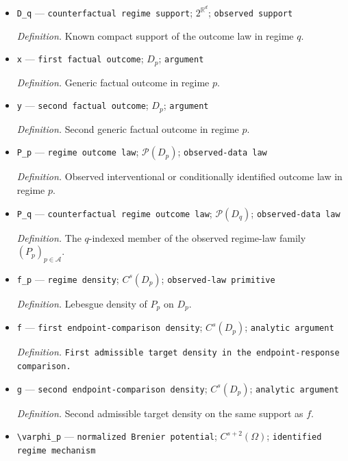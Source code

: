 \documentclass{article}
\begin{document}
\begin{itemize}
  \par\smallskip\noindent\emph{Definition.} Known compact support of the outcome law in regime \(p\).
  \item \texttt{D\_\allowbreak{}q} --- \texttt{counterfactual regime support}; \(2^{\mathbb R^d}\); \texttt{observed support}
  \par\smallskip\noindent\emph{Definition.} Known compact support of the outcome law in regime \(q\).
  \item \texttt{x} --- \texttt{first factual outcome}; \(D_p\); \texttt{argument}
  \par\smallskip\noindent\emph{Definition.} Generic factual outcome in regime \(p\).
  \item \texttt{y} --- \texttt{second factual outcome}; \(D_p\); \texttt{argument}
  \par\smallskip\noindent\emph{Definition.} Second generic factual outcome in regime \(p\).
  \item \texttt{P\_\allowbreak{}p} --- \texttt{regime outcome law}; \(\mathcal P(D_p)\); \texttt{observed-\allowbreak{}data law}
  \par\smallskip\noindent\emph{Definition.} Observed interventional or conditionally identified outcome law in regime \(p\).
  \item \texttt{P\_\allowbreak{}q} --- \texttt{counterfactual regime outcome law}; \(\mathcal P(D_q)\); \texttt{observed-\allowbreak{}data law}
  \par\smallskip\noindent\emph{Definition.} The \(q\)-indexed member of the observed regime-law family \((P_p)_{p\in\mathcal A}\).
  \item \texttt{f\_\allowbreak{}p} --- \texttt{regime density}; \(C^s(D_p)\); \texttt{observed-\allowbreak{}law primitive}
  \par\smallskip\noindent\emph{Definition.} Lebesgue density of \(P_p\) on \(D_p\).
  \item \texttt{f} --- \texttt{first endpoint-\allowbreak{}comparison density}; \(C^s(D_p)\); \texttt{analytic argument}
  \par\smallskip\noindent\emph{Definition.} \texttt{First admissible target density in the endpoint-\allowbreak{}response comparison.}
  \item \texttt{g} --- \texttt{second endpoint-\allowbreak{}comparison density}; \(C^s(D_p)\); \texttt{analytic argument}
  \par\smallskip\noindent\emph{Definition.} Second admissible target density on the same support as \(f\).
  \item \texttt{\textbackslash{}\allowbreak{}varphi\_\allowbreak{}p} --- \texttt{normalized Brenier potential}; \(C^{s+2}(\Omega)\); \texttt{identified regime mechanism}

\end{itemize}
\end{document}
